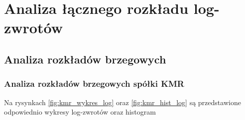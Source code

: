 \documentclass[a4paper,11pt]{article}
\begin{document}
\pagebreak
\section{Analiza łącznego rozkładu log-zwrotów}
\subsection{Analiza rozkładów brzegowych}
\subsubsection{Analiza rozkładów brzegowych spółki KMR}

Na rysynkach \ref{fig:kmr_wykres_log} oraz \ref{fig:kmr_hist_log} są przedstawione odpowiednio wykresy log-zwrotów oraz histogram
\begin{figure}[!htb]
    \centering


\end{figure}
\end{document}
